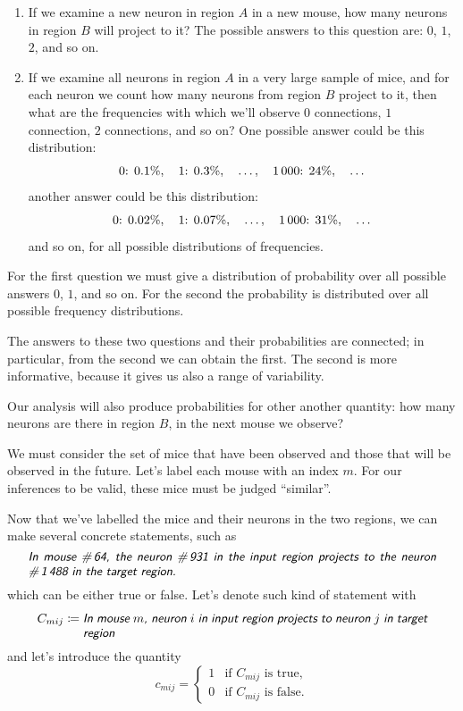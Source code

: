 \documentclass[\ifafour a4paper,12pt,\else a5paper,10pt,\fi%
onecolumn,oneside,article,%
british%
]{memoir}
\theoremstyle{remark}
\theoremstyle{innote}
\newcommand*{\defd}{\coloneqq}
\renewcommand*{\|}[1][]{\nonscript\,#1\vert\nonscript\;\mathopen{}}
\newcommand*{\yC}{C}
\newcommand*{\yc}{c}
\newcommand*{\statm}[1]{\textsl{\textsf{#1}}}
\begin{document}
\begin{enumerate}[label=\textbf{Q\arabic*}.,ref=Q\arabic*]
  \item\label{item:Q1} If we examine a new neuron in region $A$ in a new
  mouse, how many neurons in region $B$ will project to it? The possible
  answers to this question are: $0$, $1$, $2$, and so on.
  \item\label{item:Q2} If we examine all neurons in region $A$ in a very
  large sample of mice, and for each neuron we count how many neurons from
  region $B$ project to it, then what are the frequencies with which we'll
  observe $0$ connections, $1$ connection, $2$ connections, and so on? One
  possible answer could be this distribution:
  \[\text{0: }0.1\%, \quad \text{1: }0.3\%, \quad\dotsc,
    \quad \text{1\,000: }24\%, \quad \dotsc\]
  another answer could be this distribution:
  \[\text{0: }0.02\%, \quad \text{1: }0.07\%, \quad\dotsc,
    \quad \text{1\,000: }31\%, \quad \dotsc\]
  and so on, for all possible distributions of frequencies.
\end{enumerate}
For the first question we must give a distribution of probability over all
possible answers $0$, $1$, and so on. For the second the probability is
distributed over all possible frequency distributions.

The answers to these two questions and their probabilities are connected;
in particular, from the second we can obtain the first. The second is more
informative, because it gives us also a range of variability.

Our analysis will also produce probabilities for other another quantity:
how many neurons are there in region $B$, in the next mouse we observe?


We must consider the set of mice that have been observed and those that will
be observed in the future. Let's label each mouse with an index $m$. For
our inferences to be valid, these mice must be judged \enquote{similar}.

Now that we've labelled the mice and their neurons in the two regions, we
can make several concrete statements, such as
\[\parbox{0.95\linewidth}{\statm{In mouse \#\,64, the neuron \#\,931 in the input
      region projects to the neuron \#\,1\,488 in the target region.}}\]
which can be either true or false. Let's denote such kind of statement with
\begin{equation}
  \label{eq:statement_connection}
  \yC_{mij} \defd \parbox[t]{0.8\linewidth}{\statm{In mouse $m$, neuron $i$ in input region projects to neuron $j$ in target region}}
\end{equation}
and let's introduce the quantity
\begin{equation}
  \label{eq:quantity_connection}
  \yc_{mij} =
  \begin{cases}
    1&\text{if $\yC_{mij}$ is true},\\
    0&\text{if $\yC_{mij}$ is false}.
  \end{cases}
\end{equation}
\end{document}
